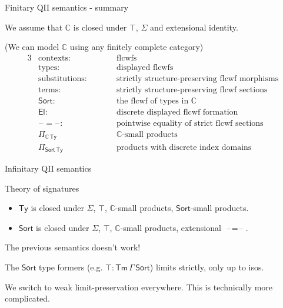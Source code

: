 \documentclass[dvipsnames]{beamer}
\newcommand{\mbb}[1]{\mathbb{#1}}
\newcommand{\Tm}{\mathsf{Tm}}
\newcommand{\Ty}{\mathsf{Ty}}
\newcommand{\El}{\mathsf{El}}
\newcommand{\blank}{\mathord{\hspace{1pt}\text{--}\hspace{1pt}}}
\newcommand{\Sort}{\mathsf{Sort}}
\newcommand{\mbbC}{\mbb{C}}
\begin{document}
\begin{frame}{Finitary QII semantics - summary}

We assume that $\mbbC$ is closed under $\top$, $\Sigma$ and extensional identity.
\vspace{1em}

(We can model $\mbbC$ using any finitely complete category)
\begin{alignat*}{3}
  & \text{contexts:}                  && \text{flcwfs}\\
  & \text{types:}                     && \text{displayed flcwfs}\\
  & \text{substitutions:}\hspace{2em} && \text{strictly structure-preserving flcwf morphisms}\\
  & \text{terms:}                     && \text{strictly structure-preserving flcwf sections}\\
  & \text{$\Sort$:}                   && \text{the flcwf of types in $\mbbC$}\\
  & \text{$\El$:}                     && \text{discrete displayed flcwf formation}\\
  & \blank\!=\blank\!:                && \text{pointwise equality of strict flcwf sections}\\
  & \Pi_{\mbbC\,\Ty}                    && \text{$\mbbC$-small products}\\
  & \Pi_{\Sort\,\Ty}                    && \text{products with discrete index domains}
\end{alignat*}

\end{frame}

\begin{frame}{Infinitary QII semantics}

\begin{block}{Theory of signatures}
  \begin{itemize}
    \item $\Ty$ is closed under $\Sigma$, $\top$, $\mbbC$-small products, $\Sort$-small products.
    \item $\Sort$ is closed under $\Sigma$, $\top$, $\mbbC$-small products, extensional $\blank\!=\!\blank$.
  \end{itemize}
\end{block}

The previous semantics doesn't work!
\vspace{1em}

The $\Sort$ type formers (e.g. $\top : \Tm\,\Gamma\,\Sort$)
 limits strictly, only up to isos.
\vspace{1em}

We switch to weak limit-preservation everywhere. This is technically more complicated.
\vspace{1em}

\end{frame}
\end{document}
